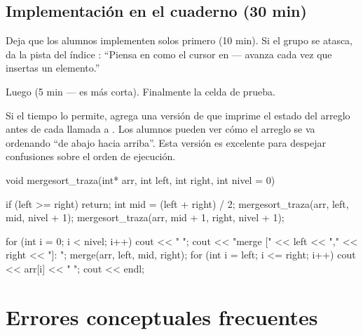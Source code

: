 \documentclass[12pt, oneside]{article}
\begin{document}
\subsection{Implementación en el cuaderno (30 min)}

Deja que los alumnos implementen  solos primero (10 min).
Si el grupo se atasca, da la pista del índice : ``Piensa en 
como el cursor en  — avanza cada vez que insertas un elemento.''

Luego  (5 min — es más corta). Finalmente la celda de prueba.

\begin{notaprofesor}
  Si el tiempo lo permite, agrega una versión de  que imprime
  el estado del arreglo antes de cada llamada a . Los alumnos
  pueden ver cómo el arreglo se va ordenando ``de abajo hacia arriba''.
  Esta versión es excelente para despejar confusiones sobre el orden de ejecución.

  \begin{codigo}
  void mergesort_traza(int* arr, int left, int right, int nivel = 0) {
      if (left >= right) return;
      int mid = (left + right) / 2;
      mergesort_traza(arr, left,    mid, nivel + 1);
      mergesort_traza(arr, mid + 1, right, nivel + 1);

      for (int i = 0; i < nivel; i++) cout << "  ";
      cout << "merge [" << left << "," << right << "]: ";
      merge(arr, left, mid, right);
      for (int i = left; i <= right; i++) cout << arr[i] << " ";
      cout << endl;
  }
  \end{codigo}
\end{notaprofesor}

\section{Errores conceptuales frecuentes}
\end{document}
